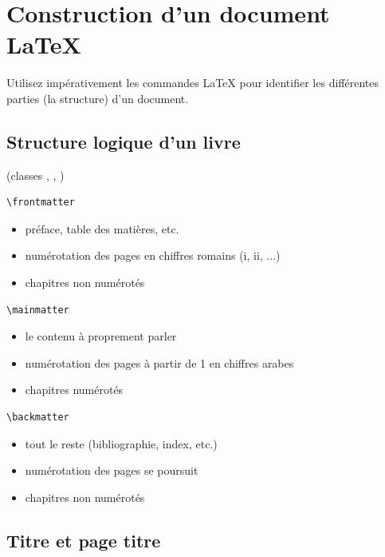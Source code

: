 \chapter{Construction d'un document {\LaTeX}}
\label{chap:construction}


\begin{conseil}
  Utilisez impérativement les commandes {\LaTeX} pour identifier
  les différentes parties (la structure) d'un document.
\end{conseil}

\section{Structure logique d'un livre}

(classes , , )

\begin{lstlisting}
\frontmatter
\end{lstlisting}
\begin{itemize}
\item préface, table des matières, etc.
\item numérotation des pages en chiffres romains (i, ii, ...)
\item chapitres non numérotés
\end{itemize}

\begin{lstlisting}
\mainmatter
\end{lstlisting}
\begin{itemize}
\item le contenu à proprement parler
\item numérotation des pages à partir de 1 en chiffres arabes
\item chapitres numérotés
\end{itemize}

\begin{lstlisting}
\backmatter
\end{lstlisting}
\begin{itemize}
\item tout le reste (bibliographie, index, etc.)
\item numérotation des pages se poursuit
\item chapitres non numérotés
\end{itemize}


\section{Titre et page titre}

